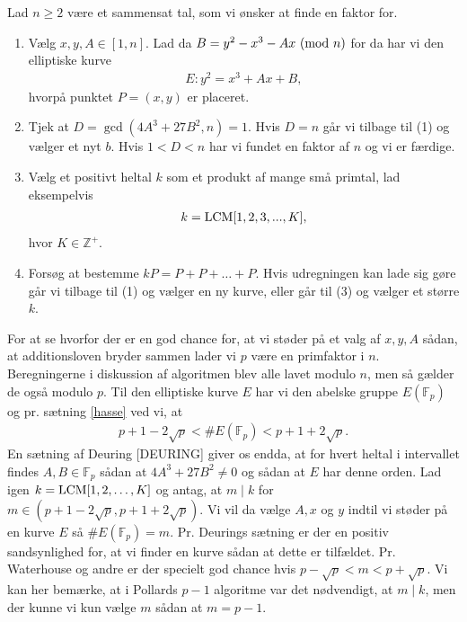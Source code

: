 \begin{algorithm}
Lad $n \geq 2$ være et sammensat tal, som vi ønsker at finde en faktor for.
\begin{enumerate}
	\item Vælg $x, y, A \in [1, n]$. Lad da $B = y^2 - x^3 - Ax \ (\mathrm{mod} \ n)$ for da har vi den elliptiske kurve
	\begin{align*}
		E : y^2 = x^3 + Ax + B, 
	\end{align*}
	hvorpå punktet $P=(x, y)$ er placeret.
	\item Tjek at $D = \gcd(4A^3 + 27B^2, n) = 1$. Hvis $D=n$ går vi tilbage
	til (1) og vælger et nyt $b$. Hvis $1 < D < n$ har vi fundet en faktor af $n$ og vi er færdige.
	\item Vælg et positivt heltal $k$ som et produkt af mange små primtal, lad eksempelvis
	\begin{align*}
		k = \mathrm{LCM}[1, 2, 3, ..., K],
	\end{align*}
	hvor $K \in \mathbb{Z}^+$.
	\item Forsøg at bestemme $kP = P + P + \ldots + P$. Hvis udregningen kan lade sig gøre går vi tilbage til (1) og 
	vælger en ny kurve, eller går til (3) og vælger et større $k$.
\end{enumerate}
\end{algorithm}
\noindent For at se hvorfor der er en god chance for, at vi støder på et valg af $x, y, A$ sådan, at additionsloven bryder sammen lader vi $p$ være en primfaktor i $n$. Beregningerne i diskussion af algoritmen blev alle lavet modulo $n$, men så gælder de også modulo $p$. Til den elliptiske kurve $E$ har vi den abelske gruppe $E(\mathbb{F}_p)$ og pr. sætning \ref{hasse} ved vi, at
\begin{align*}
	p + 1 - 2 \sqrt{p} < \#E(\mathbb{F}_p) < p + 1 + 2 \sqrt{p}.
\end{align*} 
En sætning af Deuring [DEURING] giver os endda, at for hvert heltal i intervallet findes $A, B \in \mathbb{F}_p$ sådan at $4A^3 + 27B^2 \neq 0$ og sådan at $E$ har denne orden. Lad igen $k = \mathrm{LCM}[1, 2, \ldots, K]$ og antag, at $m \mid k$ for $m \in (p+1-2\sqrt{p}, p + 1 + 2 \sqrt{p})$. Vi vil da vælge $A, x$ og $y$ indtil vi støder på en kurve $E$ så $\#E(\mathbb{F}_p) = m$. Pr. Deurings sætning er der en positiv sandsynlighed for, at vi finder en kurve sådan at dette er tilfældet. Pr. Waterhouse og andre er der specielt god chance hvis $p - \sqrt{p} < m < p + \sqrt{p}$. Vi kan her bemærke, at i Pollards $p-1$ algoritme var det nødvendigt, at $m \mid k$, men der kunne vi kun vælge $m$ sådan at 
$m = p-1$.

